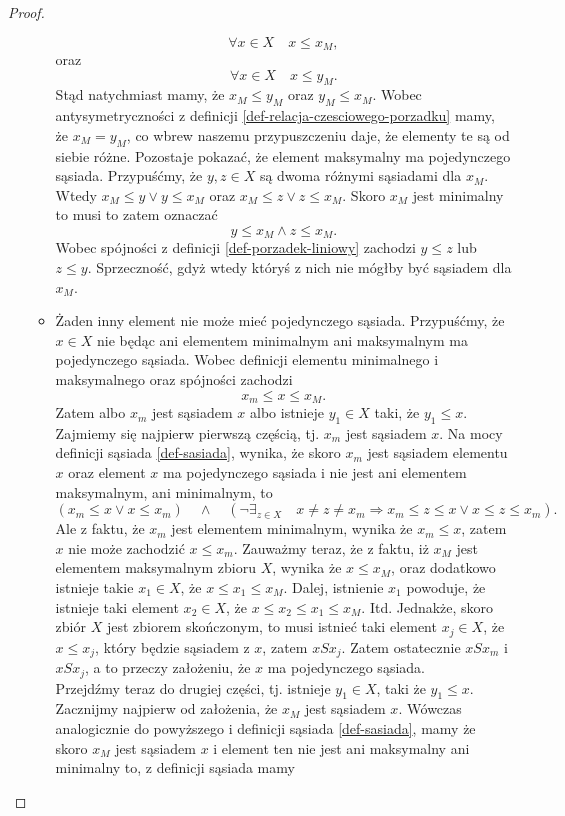 \documentclass[12pt,a4paper]{report}
\begin{document}
\begin{proof}
\begin{enumerate}
\begin{itemize}
$$
\forall x \in X \quad x \leq x_M,
$$
oraz 
$$
\forall x \in X \quad x \leq y_M.
$$
Stąd natychmiast mamy, że $x_M \leq y_M$ oraz $y_M \leq  x_M$. Wobec antysymetryczności z definicji \ref{def-relacja-czesciowego-porzadku} mamy, że $x_M = y_M$, co wbrew naszemu przypuszczeniu daje, że elementy te są od siebie różne.
Pozostaje pokazać, że element maksymalny ma pojedynczego sąsiada. Przypuśćmy, że $y,z \in X$ są dwoma różnymi sąsiadami dla $x_M$. Wtedy $ x_M \leq y \lor y \leq x_M$ oraz $ x_M \leq z \lor z \leq x_M$. Skoro $x_M$ jest minimalny to musi to zatem oznaczać
$$
y \leq x_M \land z \leq x_M.
$$ 
Wobec spójności z definicji \ref{def-porzadek-liniowy} zachodzi $y \leq z$ lub $z \leq y$. Sprzeczność, gdyż wtedy któryś z nich nie mógłby być sąsiadem dla $x_M$.

\item Żaden inny element nie może mieć pojedynczego sąsiada. Przypuśćmy, że $x \in X$ nie będąc ani elementem minimalnym ani maksymalnym ma pojedynczego sąsiada. Wobec definicji elementu minimalnego i maksymalnego oraz spójności zachodzi
$$
x_m \leq x \leq x_M.
$$
Zatem albo $x_m$ jest sąsiadem $x$ albo istnieje $y_1 \in X$ taki, że $y_1 \leq x$.
\newline
Zajmiemy się najpierw pierwszą częścią, tj. $x_m$ jest sąsiadem $x$. Na mocy definicji sąsiada \ref{def-sasiada}, wynika, że skoro $x_m$ jest sąsiadem elementu $x$ oraz element $x$ ma pojedynczego sąsiada i nie jest ani elementem maksymalnym, ani minimalnym, to  $$\left(x_m \leq x \lor x \leq x_m\right) \quad \land \quad \left(\lnot \exists_{z \in X}  \quad x\neq z \neq x_m \Rightarrow   x_m \leq z \leq x \lor x \leq z \leq x_m \right). $$
Ale z faktu, że $x_m$ jest elementem minimalnym, wynika że $x_m \leq x$, zatem $x$ nie może zachodzić $x \leq x_m$. Zauważmy teraz, że z faktu, iż $x_M$ jest elementem maksymalnym zbioru $X$, wynika że $ x \leq x_M$, oraz dodatkowo istnieje takie $x_1 \in X$, że $x\leq x_1 \leq x_M$. Dalej, istnienie $x_1$ powoduje, że istnieje taki element $x_2 \in X$, że $x \leq x_2 \leq x_1 \leq x_M$. Itd. Jednakże, skoro zbiór $X$ jest zbiorem skończonym, to musi istnieć taki element $x_j \in X$, że $x \leq x_j$, który będzie sąsiadem z $x$, zatem $xSx_j$. Zatem ostatecznie $xSx_m$ i $xSx_j$, a to przeczy założeniu, że $x$ ma pojedynczego sąsiada. \\
Przejdźmy teraz do drugiej części, tj. istnieje $y_1\in X$, taki że $y_1 \leq x$. Zacznijmy najpierw od założenia,  że $x_M$ jest sąsiadem $x$. Wówczas analogicznie do powyższego i definicji sąsiada \ref{def-sasiada}, mamy że skoro $x_M$ jest sąsiadem $x$ i element ten nie jest ani maksymalny ani minimalny to, z definicji sąsiada mamy

\end{itemize}
\end{enumerate}
\end{proof}
\end{document}
